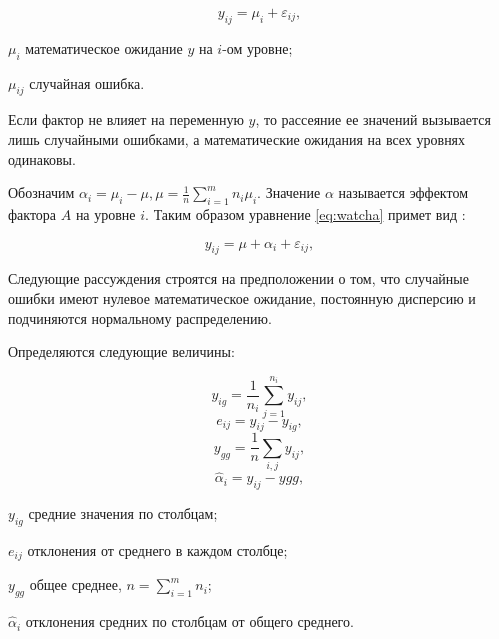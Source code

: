 \begin{equation}
\label{eq:watcha}
y_{ij} = \mu_i+\varepsilon_{ij},
\end{equation}
\begin{eqexpl}[15mm]
\item{$\mu_i$} математическое ожидание $y$ на $i$-ом уровне;
\item{$\mu_{ij}$} случайная ошибка.
\end{eqexpl}

Если фактор не влияет на переменную $y$, то рассеяние ее значений вызывается лишь случайными ошибками, а математические ожидания на всех уровнях одинаковы. \cite{disperMethod}

Обозначим $\alpha_i=\mu_i-\mu, \mu=\frac{1}{n}\sum_{i=1}^{m}{n_i\mu_i}$. Значение $\alpha$ называется эффектом фактора $A$ на уровне $i$. Таким образом уравнение \eqref{eq:watcha} примет вид \cite{disperMethod}:

\begin{equation}
\label{eq:watcha}
y_{ij} = \mu+\alpha_i+\varepsilon_{ij},
\end{equation}


Следующие рассуждения строятся на предположении о том, что случайные ошибки имеют нулевое математическое ожидание, постоянную дисперсию и подчиняются нормальному распределению.

Определяются следующие величины:

\begin{equation}
\label{eq:yig}
y_{ig}=\frac{1}{n_i}\sum_{j=1}^{n_i}{y_{ij}},
\end{equation}
\begin{equation}
\label{eq:eij}
e_{ij}=y_{ij}-y_{ig},
\end{equation}
\begin{equation}
\label{eq:ygg}
y_{gg}=\frac{1}{n}\sum_{i,j}{y_{ij}},
\end{equation}
\begin{equation}
\label{eq:alphai}
\widehat{\alpha}_i=y_{ij}-y{gg},
\end{equation}
\begin{eqexpl}[15mm]
\item{$y_{ig}$} средние значения по столбцам;
\item{$e_{ij}$} отклонения от среднего в каждом столбце;
\item{$y_{gg}$} общее среднее, $n=\sum_{i=1}^{m}{n_i}$;
\item{$\widehat{\alpha}_i$} отклонения средних по столбцам от общего среднего.
\end{eqexpl}

